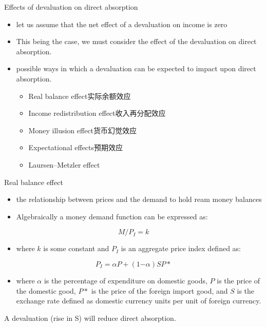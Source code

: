 \documentclass[10pt,hyperref={CJKbookmarks=true},xcolor=dvipsnames,aspectratio=169]{beamer}
\begin{document}
\begin{frame}{Effects of devaluation on direct absorption}

\begin{itemize}
\item let us assume that the net effect of a devaluation on income is zero
\item This being the case, we must consider the effect of the devaluation
on direct absorption.
\item possible ways in which a devaluation can be expected to impact upon
direct absorption.

\begin{itemize}
\item Real balance effect实际余额效应
\item Income redistribution effect收入再分配效应
\item Money illusion effect货币幻觉效应
\item Expectational effects预期效应
\item Laursen–Metzler effect
\end{itemize}
\end{itemize}
\end{frame}

\begin{frame}{Real balance effect}

\begin{itemize}
\item the relationship between prices and the demand to hold ream money
balances
\item Algebraically a money demand function can be expressed as:
\end{itemize}

\[
M/P_{I}=k
\]

\begin{itemize}
\item where $k$ is some constant and $P_{I}$ is an aggregate price index
defined as:
\end{itemize}

\[
P_{I}=\alpha P+(1\text{−}\alpha)SP*
\]

\begin{itemize}
\item where $\alpha$ is the percentage of expenditure on domestic goods,
$P$ is the price of the domestic good, $P*$ is the price of the
foreign import good, and $S$ is the exchange rate defined as domestic
currency units per unit of foreign currency.\end{itemize}
\begin{block}{A devaluation (rise in S) will reduce direct absorption.}



\end{block}
\end{frame}
\end{document}
